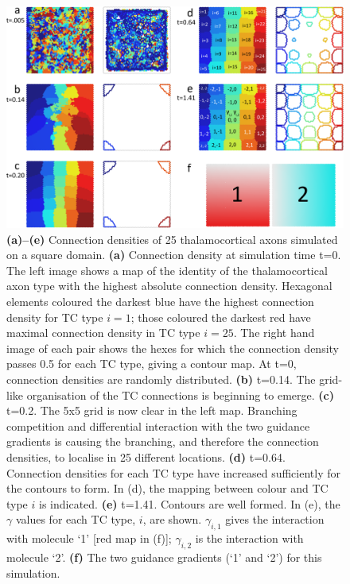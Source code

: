 \documentclass[a4paper,11pt]{article}
\begin{document}
\begin{figure}
\begin{center}
\includegraphics[width=\textwidth]{./Fig_25N2M_square/Fig_25N2M_square.png}
\end{center}
\caption{\textbf{(a)--(e)} Connection densities of 25 thalamocortical axons
  simulated on a square domain. \textbf{(a)} Connection density at simulation
  time t=0. The left image shows a map of the identity of the thalamocortical
  axon type with the highest absolute connection density. Hexagonal elements
  coloured the darkest blue have the highest connection density for TC type
  $i=1$; those coloured the darkest red have maximal connection density in TC
  type $i=25$. The right hand image of each pair shows the hexes for which the
  connection density passes 0.5 for each TC type, giving a contour map. At
  t=0, connection densities are randomly distributed. \textbf{(b)} t=0.14. The
  grid-like organisation of the TC connections is beginning to emerge.
  \textbf{(c)} t=0.2. The 5x5 grid is now clear in the left map. Branching
  competition and differential interaction with the two guidance gradients is
  causing the branching, and therefore the connection densities, to localise in
  25 different locations. \textbf{(d)} t=0.64. Connection densities for each
  TC type have increased sufficiently for the contours to form. In (d), the
  mapping between colour and TC type $i$ is indicated. \textbf{(e)}
  t=1.41. Contours are well formed. In (e), the $\gamma$ values for each TC
  type, $i$, are shown. $\gamma_{i,1}$ gives the interaction with molecule `1'
  [red map in (f)]; $\gamma_{i,2}$ is the interaction with molecule
  `2'. \textbf{(f)} The two guidance gradients (`1' and `2') for this
  simulation.}
\label{fig:square}
\end{figure}
\end{document}
